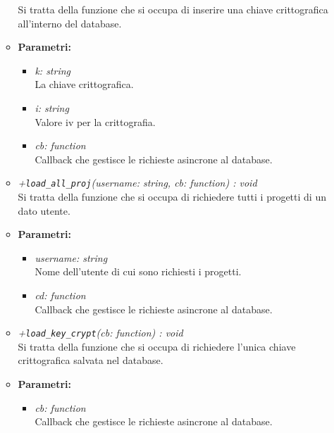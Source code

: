 \begin{itemize}
\begin{itemize}
            Si tratta della funzione che si occupa di inserire una chiave crittografica all'interno del database.\\
            \item \textbf{Parametri: }\\
            \begin{itemize}
              \item \emph{k: string}\\
              La chiave crittografica.
              \item \emph{i: string}\\
              Valore iv per la crittografia.
              \item \emph{cb: function}\\
              Callback che gestisce le richieste asincrone al database.
            \end{itemize}
            \item \emph{+\texttt{load\_all\_proj}(username: string, cb: function) : void}\\
            Si tratta della funzione che si occupa di richiedere tutti i progetti di un dato utente.\\
            \item \textbf{Parametri: }\\
            \begin{itemize}
              \item \emph{username: string}\\
              Nome dell'utente di cui sono richiesti i progetti.
              \item \emph{cd: function}\\
              Callback che gestisce le richieste asincrone al database.
            \end{itemize}
            \item \emph{+\texttt{load\_key\_crypt}(cb: function) : void}\\
            Si tratta della funzione che si occupa di richiedere l'unica chiave crittografica salvata nel database.\\
            \item \textbf{Parametri: }\\
            \begin{itemize}
              \item \emph{cb: function}\\
              Callback che gestisce le richieste asincrone al database.
            \end{itemize}

\end{itemize}
\end{itemize}
